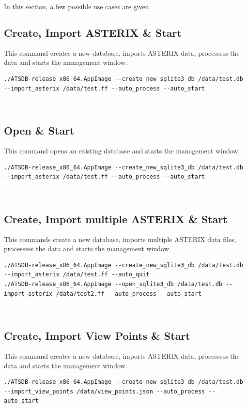 In this section, a few possible use cases are given.

\subsection{Create, Import ASTERIX \& Start}

This command creates a new database, imports ASTERIX data, processess the data and starts the management window.

\begin{lstlisting}
./ATSDB-release_x86_64.AppImage --create_new_sqlite3_db /data/test.db --import_asterix /data/test.ff --auto_process --auto_start
\end{lstlisting}
\ \\

\subsection{Open \& Start}

This command opens an existing database and starts the management window.

\begin{lstlisting}
./ATSDB-release_x86_64.AppImage --create_new_sqlite3_db /data/test.db --import_asterix /data/test.ff --auto_process --auto_start
\end{lstlisting}
\ \\

\subsection{Create, Import multiple ASTERIX \& Start}

This commands create a new database, imports multiple ASTERIX data files, processess the data and starts the management window.

\begin{lstlisting}
./ATSDB-release_x86_64.AppImage --create_new_sqlite3_db /data/test.db --import_asterix /data/test.ff --auto_quit
./ATSDB-release_x86_64.AppImage --open_sqlite3_db /data/test.db --import_asterix /data/test2.ff --auto_process --auto_start
\end{lstlisting}
\ \\

\subsection{Create, Import View Points \& Start}

This command creates a new database, imports ASTERIX data, processess the data and starts the management window.

\begin{lstlisting}
./ATSDB-release_x86_64.AppImage --create_new_sqlite3_db /data/test.db --import_view_points /data/view_points.json --auto_process --auto_start
\end{lstlisting}
\ \\
